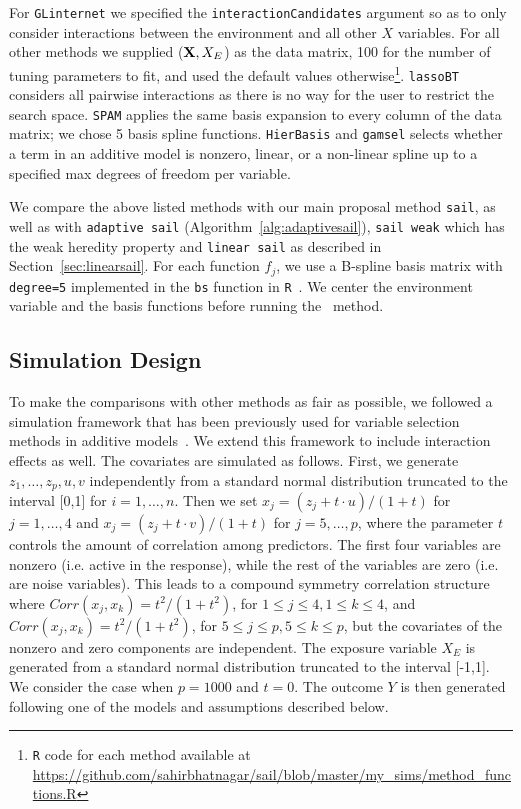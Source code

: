 For \texttt{GLinternet} we specified the \texttt{interactionCandidates} argument so as to only consider interactions between the environment and all other $X$ variables. For all other methods we supplied ($\textbf{X}, X_E$) as the data matrix, 100 for the number of tuning parameters to fit, and used the default values otherwise\footnote[1]{\texttt{R} code for each method available at \url{https://github.com/sahirbhatnagar/sail/blob/master/my_sims/method_functions.R}}. \texttt{lassoBT} considers all pairwise interactions as there is no way for the user to restrict the search space. \texttt{SPAM} applies the same basis expansion to every column of the data matrix; we chose 5 basis spline functions. \texttt{HierBasis} and \texttt{gamsel} selects whether a term in an additive model is nonzero, linear, or a non-linear spline up to a specified max degrees of freedom per variable. 

We compare the above listed methods with our main proposal method \texttt{sail}, as well as with \texttt{adaptive sail} (Algorithm~\ref{alg:adaptivesail}), \texttt{sail weak} which has the weak heredity property and \texttt{linear sail} as described in Section~\ref{sec:linearsail}. For each function $f_j$, we use a B-spline basis matrix with \texttt{degree=5} implemented in the \texttt{bs} function in \texttt{R}~\citep{cran}. We center the environment variable and the basis functions before running the \sail ~method.


\subsection{Simulation Design}
To make the comparisons with other methods as fair as possible, we followed a simulation framework that has been previously used for variable selection methods in additive models~\citep{lin2006component,huang2010variable}. 
We extend this framework to include interaction effects as well. 
The covariates are simulated as follows. First, we generate $z_1,\ldots, z_p, u,v$ independently from a standard normal distribution truncated to the interval [0,1] for $i=1,\ldots,n$. Then we set $x_j = (z_j + t\cdot u)/(1 + t)$ for $j = 1,\ldots, 4$ and $x_j = (z_j + t\cdot v)/(1 + t)$ for $j = 5,\ldots, p$, where the parameter $t$ controls the amount of correlation among predictors. The first four variables are nonzero (i.e. active in the response), while the rest of the variables are zero (i.e. are noise variables). This leads to a compound symmetry correlation structure where $Corr(x_j,x_k) = t^2/(1+t^2)$, for $1 \leq j \leq 4, 1 \leq k \leq 4$, and $Corr(x_j,x_k) = t^2/(1+t^2)$, for $5 \leq j \leq p, 5 \leq k \leq p$, but the covariates of the nonzero and zero components are independent. The exposure variable $X_E$ is generated from a standard normal distribution truncated to the interval [-1,1]. We consider the case when $p=1000$ and $t=0$. The outcome $Y$ is then generated following one of the models and assumptions described below.

